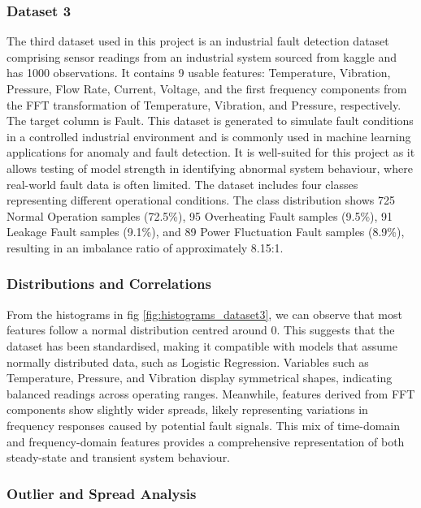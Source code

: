 \documentclass[11pt]{article}
\begin{document}
\subsubsection{Dataset 3}

The third dataset used in this project is an industrial fault detection dataset comprising sensor readings from an industrial system sourced from kaggle \cite{kaggle2023c} and has 1000 observations. It contains 9 usable features: Temperature, Vibration, Pressure, Flow Rate, Current, Voltage, and the first frequency components from the FFT transformation of Temperature, Vibration, and Pressure, respectively. The target column is Fault. This dataset is generated to simulate fault conditions in a controlled industrial environment and is commonly used in machine learning applications for anomaly and fault detection. It is well-suited for this project as it allows testing of model strength in identifying abnormal system behaviour, where real-world fault data is often limited. The dataset includes four classes representing different operational conditions. The class distribution shows 725 Normal Operation samples (72.5\%), 95 Overheating Fault samples (9.5\%), 91 Leakage Fault samples (9.1\%), and 89 Power Fluctuation Fault samples (8.9\%), resulting in an imbalance ratio of approximately 8.15:1.

\subsubsection*{Distributions and Correlations}

From the histograms in fig \ref{fig:histograms_dataset3}, we can observe that most features follow a normal distribution centred around 0. This suggests that the dataset has been standardised, making it compatible with models that assume normally distributed data, such as Logistic Regression. Variables such as Temperature, Pressure, and Vibration display symmetrical shapes, indicating balanced readings across operating ranges. Meanwhile, features derived from FFT components show slightly wider spreads, likely representing variations in frequency responses caused by potential fault signals. This mix of time-domain and frequency-domain features provides a comprehensive representation of both steady-state and transient system behaviour.

\subsubsection*{Outlier and Spread Analysis}
\end{document}
